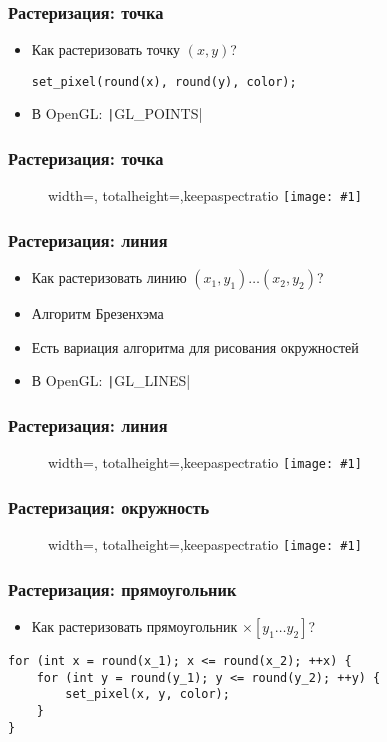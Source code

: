 \documentclass[10pt]{beamer}
\newcommand{\slideimage}[1]{
  \begin{figure}
    \begin{adjustbox}{width=\textwidth, totalheight=\textheight-2\baselineskip-2\baselineskip,keepaspectratio}
      \texttt{[image: \#1]}
    \end{adjustbox}
  \end{figure}
}
\begin{document}
\begin{frame}[fragile]
\frametitle{Растеризация: точка}
\begin{itemize}
\item Как растеризовать точку \begin{math}(x, y)\end{math}?
\pause
{}
\begin{verbatim}
set_pixel(round(x), round(y), color);
\end{verbatim}
\pause
{}
\item В OpenGL: \texttt|GL_POINTS|
\end{itemize}
\end{frame}

\begin{frame}
\frametitle{Растеризация: точка}
\slideimage{raster-point.png}
\end{frame}

\begin{frame}[fragile]
\frametitle{Растеризация: линия}
\begin{itemize}
\item Как растеризовать линию \begin{math}(x_1, y_1) \dots (x_2, y_2)\end{math}?
\pause
\item Алгоритм Брезенхэма
\pause
\item Есть вариация алгоритма для рисования окружностей
\pause
{}
\item В OpenGL: \texttt|GL_LINES|
\end{itemize}
\end{frame}

\begin{frame}
\frametitle{Растеризация: линия}
\slideimage{raster-line.png}
\end{frame}

\begin{frame}
\frametitle{Растеризация: окружность}
\slideimage{raster-circle.png}
\end{frame}

\begin{frame}[fragile]
\frametitle{Растеризация: прямоугольник}
\begin{itemize}
\item Как растеризовать прямоугольник \begin{math}[x_1\dots x_2]\times[y_1\dots y_2]\end{math}?
\end{itemize}
\pause
{}
\begin{verbatim}
for (int x = round(x_1); x <= round(x_2); ++x) {
    for (int y = round(y_1); y <= round(y_2); ++y) {
        set_pixel(x, y, color);
    }
}
\end{verbatim}
\end{frame}
\end{document}
